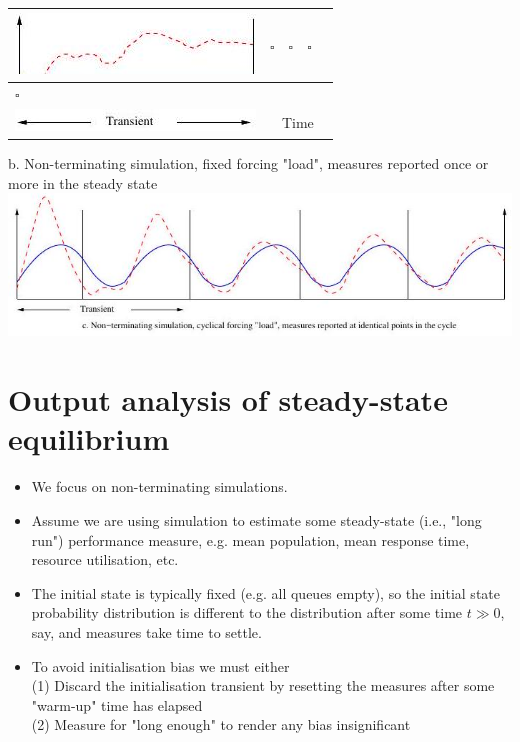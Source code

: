 \documentclass[10pt]{article}
\begin{document}
\begin{center}
\begin{tabular}{|l|l|l|l|l|}
\hline
\includegraphics[max width=\textwidth]{2025_05_12_520db7cd238ba7b44f0fg-17(3)}
 & $\square$ & $\square$ & $\square$ &  \\
\hline
$\square$ &  &  &  &  \\
\hline
\includegraphics[max width=\textwidth]{2025_05_12_520db7cd238ba7b44f0fg-17(1)}
 & \multicolumn{4}{|c|}{Time} \\
\hline
\end{tabular}
\end{center}

b. Non-terminating simulation, fixed forcing "load", measures reported once or more in the steady state\\
\includegraphics[max width=\textwidth, center]{2025_05_12_520db7cd238ba7b44f0fg-17(2)}

\section*{Output analysis of steady-state equilibrium}
\begin{itemize}
  \item We focus on non-terminating simulations.
  \item Assume we are using simulation to estimate some steady-state (i.e., "long run") performance measure, e.g. mean population, mean response time, resource utilisation, etc.
  \item The initial state is typically fixed (e.g. all queues empty), so the initial state probability distribution is different to the distribution after some time $t \gg 0$, say, and measures take time to settle.
  \item To avoid initialisation bias we must either\\
(1) Discard the initialisation transient by resetting the measures after some "warm-up" time has elapsed\\
(2) Measure for "long enough" to render any bias insignificant
\end{itemize}
\end{document}
